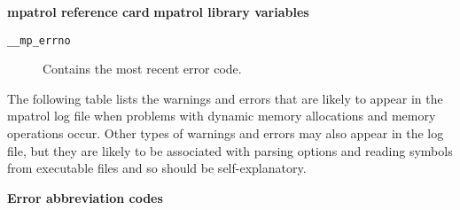 \documentclass[a4paper,landscape,final]{article}
\newcommand{\heading}[1]{\textbf{\normalsize #1}}
\newcommand{\variable}[1]{\texttt{#1}}
\begin{document}
\begin{multicols}{3}{\textbf{\Large mpatrol reference card}}
\vskip 12pt
\heading{mpatrol library variables}
\vskip 6pt

\begin{description}
\item[\variable{\_\_mp\_errno}]
\hfill Contains the most recent error code.
\end{description}

\vskip 12pt

The following table lists the warnings and errors that are likely to appear in
the mpatrol log file when problems with dynamic memory allocations and memory
operations occur.  Other types of warnings and errors may also appear in the log
file, but they are likely to be associated with parsing options and reading
symbols from executable files and so should be self-explanatory.

\vskip 12pt
\heading{Error abbreviation codes}
\vskip 6pt


\end{multicols}
\end{document}
